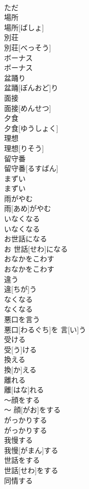 \documentclass[8pt]{extreport}
\begin{document}
\begin{CJK}{UTF8}{min}
\\	ただ
\\	場所	
\\	場所[ばしょ]
\\	別荘	
\\	別荘[べっそう]
\\	ボーナス	
\\	ボーナス
\\	盆踊り	
\\	盆踊[ぼんおど]り
\\	面接	
\\	面接[めんせつ]
\\	夕食	
\\	夕食[ゆうしょく]
\\	理想	
\\	理想[りそう]
\\	留守番	
\\	留守番[るすばん]
\\	まずい	
\\	まずい
\\	雨がやむ	
\\	雨[あめ]がやむ
\\	いなくなる	
\\	いなくなる
\\	お世話になる	
\\	お 世話[せわ]になる
\\	おなかをこわす	
\\	おなかをこわす
\\	違う	
\\	違[ちが]う
\\	なくなる	
\\	なくなる
\\	悪口を言う	
\\	悪口[わるぐち]を 言[い]う
\\	受ける	
\\	受[う]ける
\\	換える	
\\	換[か]える
\\	離れる	
\\	離[はな]れる
\\	〜顔をする	
\\	〜 顔[がお]をする
\\	がっかりする	
\\	がっかりする
\\	我慢する	
\\	我慢[がまん]する
\\	世話をする	
\\	世話[せわ]をする
\\	同情する	

\end{CJK}
\end{document}
